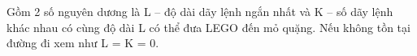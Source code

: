 \textbf{}   Gồm 2 số nguyên dương là L – độ dài dãy lệnh ngắn nhất và K – số dãy lệnh khác nhau có cùng độ dài L có thể đưa LEGO đến mỏ quặng. Nếu không tồn tại đường đi xem như L = K = 0.